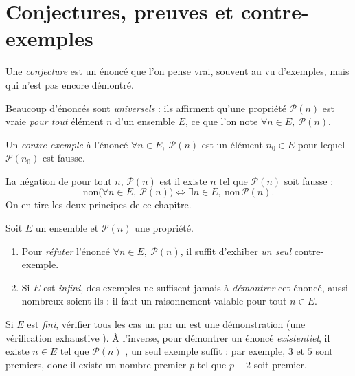 \documentclass[11pt]{article}
\begin{document}
\section{Conjectures, preuves et contre-exemples}\label{sec:conjectures-contre-exemples}

\begin{definition}
Une \emph{conjecture} est un énoncé que l'on pense vrai, souvent au vu
d'exemples, mais qui n'est pas encore démontré.
\end{definition}

Beaucoup d'énoncés sont \emph{universels} : ils affirment qu'une propriété
$\mathcal{P}(n)$ est vraie \emph{pour tout} élément $n$ d'un ensemble $E$,
ce que l'on note $\forall n \in E,\ \mathcal{P}(n)$.

\begin{definition}
Un \emph{contre-exemple} à l'énoncé $\forall n \in E,\ \mathcal{P}(n)$ est
un élément $n_0 \in E$ pour lequel $\mathcal{P}(n_0)$ est fausse.
\end{definition}

La négation de \og pour tout $n$, $\mathcal{P}(n)$ \fg{} est \og il existe
$n$ tel que $\mathcal{P}(n)$ soit fausse \fg :
\[
\text{non}\bigl(\forall n \in E,\ \mathcal{P}(n)\bigr)
\iff \exists n \in E,\ \text{non}\,\mathcal{P}(n).
\]
On en tire les deux principes de ce chapitre.

\begin{proposition}\label{prop:principes}
Soit $E$ un ensemble et $\mathcal{P}(n)$ une propriété.
\begin{enumerate}
  \item Pour \emph{réfuter} l'énoncé $\forall n \in E,\ \mathcal{P}(n)$, il
  suffit d'exhiber \emph{un seul} contre-exemple.
  \item Si $E$ est \emph{infini}, des exemples ne suffisent jamais à
  \emph{démontrer} cet énoncé, aussi nombreux soient-ils : il faut un
  raisonnement valable pour tout $n \in E$.
\end{enumerate}
\end{proposition}

\begin{remarque}
Si $E$ est \emph{fini}, vérifier tous les cas un par un est une
démonstration (une \og vérification exhaustive \fg). À l'inverse, pour
démontrer un énoncé \emph{existentiel}, \og il existe $n \in E$ tel que
$\mathcal{P}(n)$ \fg, un seul exemple suffit : par exemple, $3$ et $5$ sont
premiers, donc il existe un nombre premier $p$ tel que $p + 2$ soit premier.
\end{remarque}
\end{document}
